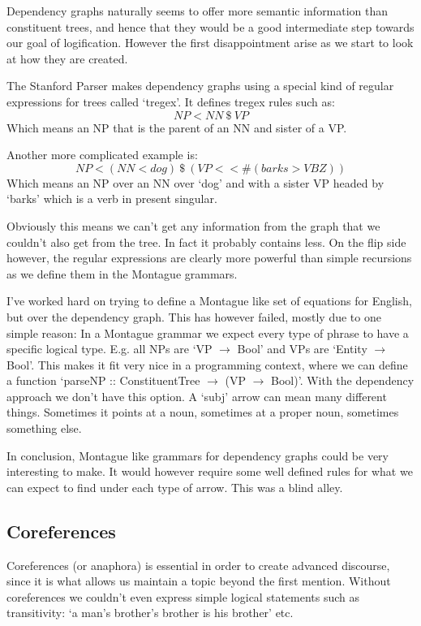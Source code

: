 \documentclass[12pt]{article}
\begin{document}
Dependency graphs naturally seems to offer more semantic information than constituent trees, and hence that they would be a good intermediate step towards our goal of logification. However the first disappointment arise as we start to look at how they are created.

The Stanford Parser makes dependency graphs using a special kind of regular expressions for trees called `tregex'\cite{de2006generating}. It defines tregex rules such as:
%
\begin{equation}
NP < NN\ \$\ VP
\end{equation}
Which means an NP that is the parent of an NN and sister of a VP.

Another more complicated example is:
\begin{equation}
NP < (NN < dog)\ \$\ (VP <\!\!<\# (barks > VBZ))
\end{equation}
Which means an NP over an NN over `dog' and with a sister VP headed by `barks' which is a verb in present singular.

Obviously this means we can't get any information from the graph that we couldn't also get from the tree. In fact it probably contains less. On the flip side however, the regular expressions are clearly more powerful than simple recursions as we define them in the Montague grammars.

I've worked hard on trying to define a Montague like set of equations for English, but over the dependency graph. This has however failed, mostly due to one simple reason: In a Montague grammar we expect every type of phrase to have a specific logical type. E.g. all NPs are `VP $\rightarrow$ Bool' and VPs are `Entity $\rightarrow$ Bool'. This makes it fit very nice in a programming context, where we can define a function `parseNP :: ConstituentTree $\rightarrow$ (VP $\rightarrow$ Bool)'. With the dependency approach we don't have this option. A `subj' arrow can mean many different things. Sometimes it points at a noun, sometimes at a proper noun, sometimes something else.

In conclusion, Montague like grammars for dependency graphs could be very interesting to make. It would however require some well defined rules for what we can expect to find under each type of arrow. This was a blind alley.

\subsection{Coreferences}\label{sec:coreferences}
Coreferences (or anaphora) is essential in order to create advanced discourse, since it is what allows us maintain a topic beyond the first mention. Without coreferences we couldn't even express simple logical statements such as transitivity: `a man's brother's brother is his brother' etc.
\end{document}
